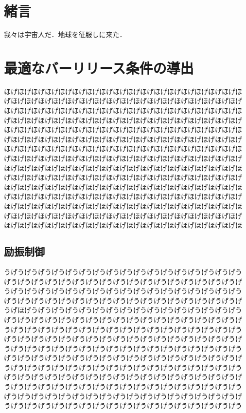 \begin{small}

\section{緒言}
我々は宇宙人\cite{Hondo:hohoge2006}だ．地球を征服しに来た．

\section{最適なバーリリース条件の導出}
ほげほげほげほげほげほげほげほげほげほげほげほげほげほげほげほげほげほ
げほげほげほげほげほげほげほげほげほげほげほげほげほげほげほげほげほげ
ほげほげほげほげほげほげほげほげほげほげほげほげほげほげほげほげほげほ
げほげほげほげほげほげほげほげほげほげほげほげほげほげほげほげほげほげ
ほげほげほげほげほげほげほげほげほげほげほげほげほげほげほげほげほげほ
げほげほげほげほげほげほげほげほげほげほげほげほげほげほげほげほげほげ
ほげほげほげほげほげほげほげほげほげほげほげほげほげほげほげほげほげほ
げほげほげほげほげほげほげほげほげほげほげほげほげほげほげほげほげほげ
ほげほげほげほげほげほげほげほげほげほげほげほげほげほげほげほげほげほ
げほげほげほげほげほげほげほげほげほげほげほげほげほげほげほげほげほげ
ほげほげほげほげほげほげほげほげほげほげほげほげほげほげほげほげほげほ
げほげほげほげほげほげほげほげほげほげほげほげほげほげほげほげほげほげ
ほげほげほげほげほげほげほげほげほげほげほげほげほげほげほげほげほげほ
げほげほげほげほげほげほげほげほげほげほげほげほげほげほげほげほげほげ
ほげほげほげほげほげほげほげほげほげほげほげほげほげほげほげほげほげほ

\subsection{励振制御}
うげうげうげうげうげうげうげうげうげうげうげうげうげうげうげうげうげう
げうげうげうげうげうげうげうげうげうげうげうげうげうげうげうげうげうげ
うげうげうげうげうげうげうげうげうげうげうげうげうげうげうげうげうげう
げうげうげうげうげうげうげうげうげうげうげうげうげうげうげうげうげうげ
うげほげうげうげうげうげうげうげうげうげうげうげうげうげうげうげうげう
げうげうげうげうげうげうげうげうげうげうげうげうげうげうげうげうげうげ
うげうげうげうげうげうげうげうげうげうげうげうげうげうげうげうげうげう
げうげうげうげうげうげうげうげうげうげうげうげうげうげうげうげうげうげ
うげうげうげうげうげうげうげうげうげうげうげうげうげうげうげうげうげう
げうげうげうげうげうげうげうげうげうげうげうげうげうげうげうげうげうげ
うげうげうげうげうげうげうげうげうげうげうげうげうげうげうげうげうげう
げうげうげうげうげうげうげうげうげうげうげうげうげうげうげうげうげうげ
うげうげうげうげうげうげうげうげうげうげうげうげうげうげうげうげうげう
げうげうげうげうげうげうげうげうげうげうげうげうげうげうげうげうげうげ
うげうげうげうげうげうげうげうげうげうげうげうげうげうげうげうげうげう


\end{small}
